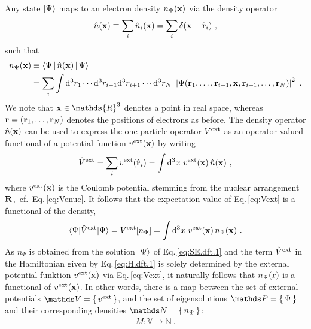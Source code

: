\documentclass[a4paper,12pt]{book}
\renewcommand{\d}{{\rm d}}
\begin{document}
Any state $\Ket{\Psi}$ maps to an electron density $n_\Psi ({\bf x})$ via the density operator
\begin{align}
	\hat n ({\bf x}) \equiv \sum_i \hat n_i ({\bf x}) = \sum_i \delta ({\bf x} - \hat{\bf r}_i)~,
	\label{eq:densop}
\end{align}
such that
\begin{align}
	n_\Psi({\bf x}) 
	&\equiv \Braket{\Psi | \hat n({\bf x}) | \Psi} \\
	&= \sum_i \int \d^3 r_1 \cdots \d^3 r_{i-1} \d^3 r_{i+1} \cdots \d^3 r_{N} ~ 
\left\lvert 
\Psi ({\bf r}_1, \ldots, {\bf r}_{i-1}, {\bf x}, {\bf r}_{i+1}, \ldots, {\bf r}_N) 
\right\rvert^2~.
\end{align}
We note that ${\bf x} \in \mathds{R}^3$ denotes a point in real space, whereas ${\bf r} = ({\bf r}_1, \ldots, {\bf r}_N)$ denotes the positions of electrons as before.
The density operator $\hat n ({\bf x})$ can be used to express the one-particle operator $V^{\rm ext}$ as an operator valued functional of a potential function $v^{\rm ext} ({\bf x})$ by writing
\begin{align}
	\hat V^{\rm ext}
		= \sum_i v^{\rm ext} (\hat{\bf r}_i)
		= \int \d^3 x ~ v^{\rm ext} ({\bf x}) \, \hat n ({\bf x})~,
		\label{eq:Vext}
\end{align}
where $v^{\rm ext} ({\bf x})$ is the Coulomb potential stemming from the nuclear arrangement $\bf R$,~cf.~Eq.\,\eqref{eq:Venuc}.
It follows that the expectation value of Eq.\,\eqref{eq:Vext} is a functional of the density,
\begin{align}
	\braket{\Psi | \hat V^{\rm ext} | \Psi}
		= V^{\rm ext} [n_\Psi]
		= \int \d^3 x ~ v^{\rm ext} ({\bf x}) \, n_\Psi ({\bf x})~.
		\label{eq:dft.Vext.expectation}
\end{align}
As $n_\Psi$ is obtained from the solution $\Ket{\Psi}$ of Eq.\,\eqref{eq:SE.dft.1} and the term $\hat V^{\rm ext}$ in the Hamiltonian given by Eq.\,\eqref{eq:H.dft.1} is solely determined by the external potential funktion $v^{\rm ext} ({\bf x})$ via Eq.\,\eqref{eq:Vext}, it naturally follows that $n_\Psi ({\bf r})$ is a functional of $v^{\rm ext} ({\bf x})$. In other words, there is a map between the set of external potentials $\mathds V = \set{v^{\rm ext}}$, and the set of eigensolutions $\mathds P = \set{\Psi}$ and their corresponding densities $\mathds N = \set{n_\Psi}$:
\begin{align}
	M: \mathds V \rightarrow \mathds N~.
	\label{eq:dft.map.1}
\end{align}
\end{document}
